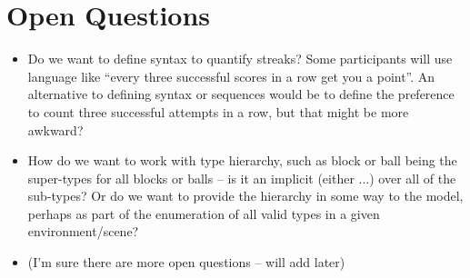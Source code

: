 \documentclass{article}
\begin{document}

\section{Open Questions}
\begin{itemize}
    \item Do we want to define syntax to quantify streaks? Some participants will use language like ``every three successful scores in a row get you a point''. An alternative to defining syntax or sequences would be to define the preference to count three successful attempts in a row, but that might be more awkward?
    
    \item How do we want to work with type hierarchy, such as block or ball being the super-types for all blocks or balls -- is it an implicit (either ...) over all of the sub-types? Or do we want to provide the hierarchy in some way to the model, perhaps as part of the enumeration of all valid types in a given environment/scene?
    
    \item (I'm sure there are more open questions -- will add later)
\end{itemize}
\end{document}
